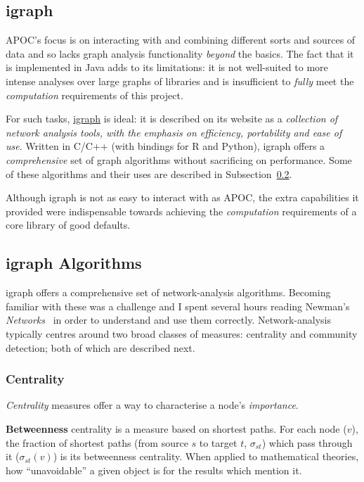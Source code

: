 \subsection{igraph}\label{subsubsec:neo4jtoolsigraph}

APOC's focus is on interacting with and combining different sorts and sources of
data and so lacks graph analysis functionality \emph{beyond} the basics. The
fact that it is implemented in Java adds to its limitations: it is not
well-suited to more intense analyses over large graphs of libraries and is
insufficient to \emph{fully} meet the \emph{computation} requirements of this
project.

For such tasks, \href{http://www.igraph.org}{igraph} is ideal: it is described
on its website as a \emph{collection of network analysis tools, with the
emphasis on efficiency, portability and ease of use}. Written in C/C++ (with
bindings for R and Python), igraph offers a \emph{comprehensive} set of graph
algorithms without sacrificing on performance. Some of these algorithms and
their uses are described in Subsection~\ref{subsec:igraphalg}.

Although igraph is not as easy to interact with  as APOC, the extra capabilities
it provided were indispensable towards achieving the \emph{computation}
requirements of a core library of good defaults.

\subsection{igraph Algorithms}\label{subsec:igraphalg}

igraph offers a comprehensive set of network-analysis algorithms. Becoming
familiar with these was a challenge and I spent several hours reading Newman's
\emph{Networks}~\cite{newman2008} in order to understand and use them correctly.
Network-analysis typically centres around two broad classes of measures:
centrality and community detection; both of which are described next.

\subsubsection{Centrality}

\emph{Centrality} measures offer a way to characterise a node's \emph{importance}.

\textbf{Betweenness} centrality is a measure based on shortest paths. For each
node ($v$), the fraction of shortest paths (from source $s$ to target $t$,
$\sigma_{st}$) which pass through it ($\sigma_{st}\left(v\right)$) is its
betweenness centrality. When applied to mathematical theories, how
``unavoidable'' a given object is for the results which mention
it.~\cite{freeman1977}

